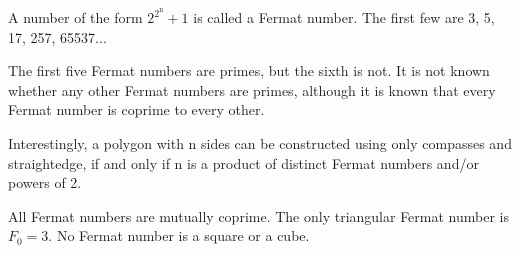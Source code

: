 A number of the form $ 2^{2^{\mathrm{n}}}+1 $ is called a Fermat number. The first few are
3, 5, 17, 257, 65537...
\par
The first five Fermat numbers are primes, but the sixth is not. It is not
known whether any other Fermat numbers are primes, although it is known that
every Fermat number is coprime to every other.
\par
Interestingly, a polygon with n sides can be constructed using only compasses
and straightedge, if and only if n is a product of distinct Fermat numbers 
and/or powers of 2.
\par
All Fermat numbers are mutually coprime. The only
triangular Fermat number is $F_{0}=3.$  No Fermat number
is a square or a cube.
